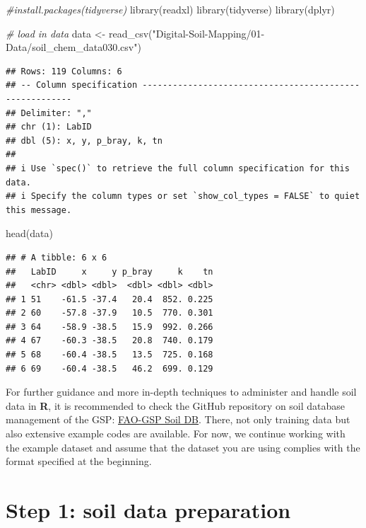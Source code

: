 \documentclass[
  10pt,
  b5paper,
  oneside]{book}
\newenvironment{Shaded}{\begin{snugshade}}{\end{snugshade}}
\newcommand{\CommentTok}[1]{\textcolor[rgb]{0.56,0.35,0.01}{\textit{#1}}}
\newcommand{\FunctionTok}[1]{\textcolor[rgb]{0.00,0.00,0.00}{#1}}
\newcommand{\NormalTok}[1]{#1}
\newcommand{\OtherTok}[1]{\textcolor[rgb]{0.56,0.35,0.01}{#1}}
\newcommand{\StringTok}[1]{\textcolor[rgb]{0.31,0.60,0.02}{#1}}
\begin{document}
\begin{Shaded}
\begin{Highlighting}[]
\CommentTok{\#install.packages(tidyverse)}
\FunctionTok{library}\NormalTok{(readxl)}
\FunctionTok{library}\NormalTok{(tidyverse)}
\FunctionTok{library}\NormalTok{(dplyr)}

\CommentTok{\# load in data}
\NormalTok{data }\OtherTok{\textless{}{-}} 
  \FunctionTok{read\_csv}\NormalTok{(}\StringTok{"Digital{-}Soil{-}Mapping/01{-}Data/soil\_chem\_data030.csv"}\NormalTok{)}
\end{Highlighting}
\end{Shaded}

\begin{verbatim}
## Rows: 119 Columns: 6
## -- Column specification --------------------------------------------------------
## Delimiter: ","
## chr (1): LabID
## dbl (5): x, y, p_bray, k, tn
## 
## i Use `spec()` to retrieve the full column specification for this data.
## i Specify the column types or set `show_col_types = FALSE` to quiet this message.
\end{verbatim}

\begin{Shaded}
\begin{Highlighting}[]
\FunctionTok{head}\NormalTok{(data)}
\end{Highlighting}
\end{Shaded}

\begin{verbatim}
## # A tibble: 6 x 6
##   LabID     x     y p_bray     k    tn
##   <chr> <dbl> <dbl>  <dbl> <dbl> <dbl>
## 1 51    -61.5 -37.4   20.4  852. 0.225
## 2 60    -57.8 -37.9   10.5  770. 0.301
## 3 64    -58.9 -38.5   15.9  992. 0.266
## 4 67    -60.3 -38.5   20.8  740. 0.179
## 5 68    -60.4 -38.5   13.5  725. 0.168
## 6 69    -60.4 -38.5   46.2  699. 0.129
\end{verbatim}

For further guidance and more in-depth techniques to administer and handle soil data in \textbf{R}, it is recommended to check the GitHub repository on soil database management of the GSP: \href{https://github.com/FAO-GSP/SoilDB}{FAO-GSP Soil DB}. There, not only training data but also extensive example codes are available.
For now, we continue working with the example dataset and assume that the dataset you are using complies with the format specified at the beginning.

\hypertarget{step-1-soil-data-preparation}{%
\chapter{Step 1: soil data preparation}\label{step-1-soil-data-preparation}}
\end{document}
